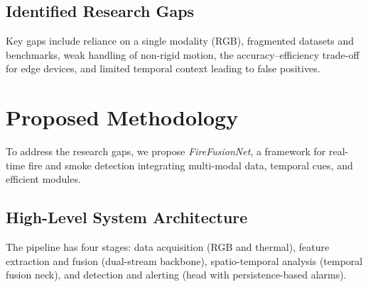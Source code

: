 \documentclass[12pt,a4paper]{article}
\begin{document}
\subsection{Identified Research Gaps}
Key gaps include reliance on a single modality (RGB), fragmented datasets and benchmarks, weak handling of non-rigid motion, the accuracy--efficiency trade-off for edge devices, and limited temporal context leading to false positives.

\section{Proposed Methodology}
To address the research gaps, we propose \emph{FireFusionNet}, a framework for real-time fire and smoke detection integrating multi-modal data, temporal cues, and efficient modules.

\subsection{High-Level System Architecture}
The pipeline has four stages: data acquisition (RGB and thermal), feature extraction and fusion (dual-stream backbone), spatio-temporal analysis (temporal fusion neck), and detection and alerting (head with persistence-based alarms).
\end{document}
